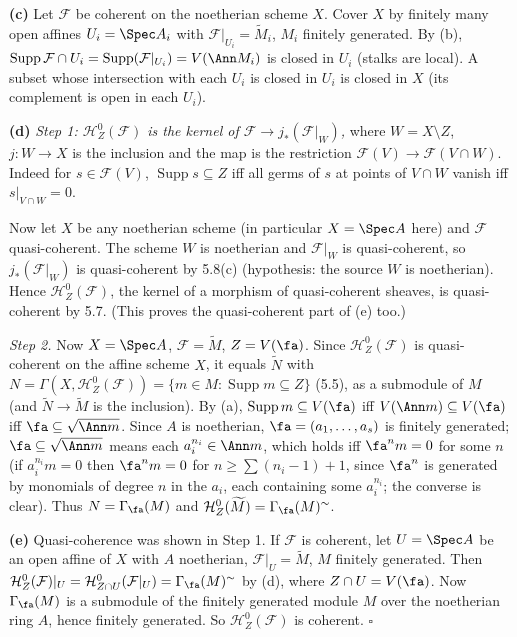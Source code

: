 \documentclass[11pt]{article}
\begin{document}
\textbf{(c)} Let $\mathcal F$ be coherent on the noetherian scheme $X$. Cover $X$ by finitely many open affines $U_i=\Spec A_i$ with $\mathcal F|_{U_i}=\widetilde M_i$, $M_i$ finitely generated. By (b), $\operatorname{Supp}\mathcal F\cap U_i=\operatorname{Supp}(\mathcal F|_{U_i})=V(\Ann M_i)$ is closed in $U_i$ (stalks are local). A subset whose intersection with each $U_i$ is closed in $U_i$ is closed in $X$ (its complement is open in each $U_i$).

\textbf{(d)} \emph{Step 1: $\mathcal H^0_Z(\mathcal F)$ is the kernel of $\mathcal F\to j_*(\mathcal F|_W)$,} where $W=X\setminus Z$, $j:W\to X$ is the inclusion and the map is the restriction $\mathcal F(V)\to\mathcal F(V\cap W)$. Indeed for $s\in\mathcal F(V)$, $\operatorname{Supp}s\subseteq Z$ iff all germs of $s$ at points of $V\cap W$ vanish iff $s|_{V\cap W}=0$.

Now let $X$ be any noetherian scheme (in particular $X=\Spec A$ here) and $\mathcal F$ quasi-coherent. The scheme $W$ is noetherian and $\mathcal F|_W$ is quasi-coherent, so $j_*(\mathcal F|_W)$ is quasi-coherent by 5.8(c) (hypothesis: the source $W$ is noetherian). Hence $\mathcal H^0_Z(\mathcal F)$, the kernel of a morphism of quasi-coherent sheaves, is quasi-coherent by 5.7. (This proves the quasi-coherent part of (e) too.)

\emph{Step 2.} Now $X=\Spec A$, $\mathcal F=\widetilde M$, $Z=V(\fa)$. Since $\mathcal H^0_Z(\mathcal F)$ is quasi-coherent on the affine scheme $X$, it equals $\widetilde N$ with $N=\Gamma(X,\mathcal H^0_Z(\mathcal F))=\{m\in M:\operatorname{Supp}m\subseteq Z\}$ (5.5), as a submodule of $M$ (and $\widetilde N\to\widetilde M$ is the inclusion). By (a), $\operatorname{Supp}m\subseteq V(\fa)$ iff $V(\Ann m)\subseteq V(\fa)$ iff $\fa\subseteq\sqrt{\Ann m}$. Since $A$ is noetherian, $\fa=(a_1,\dots,a_s)$ is finitely generated; $\fa\subseteq\sqrt{\Ann m}$ means each $a_i^{n_i}\in\Ann m$, which holds iff $\fa^nm=0$ for some $n$ (if $a_i^{n_i}m=0$ then $\fa^{n}m=0$ for $n\geq\sum(n_i-1)+1$, since $\fa^n$ is generated by monomials of degree $n$ in the $a_i$, each containing some $a_i^{n_i}$; the converse is clear). Thus $N=\Gamma_\fa(M)$ and $\mathcal H^0_Z(\widetilde M)=\Gamma_\fa(M)^{\sim}$.

\textbf{(e)} Quasi-coherence was shown in Step 1. If $\mathcal F$ is coherent, let $U=\Spec A$ be an open affine of $X$ with $A$ noetherian, $\mathcal F|_U=\widetilde M$, $M$ finitely generated. Then $\mathcal H^0_Z(\mathcal F)|_U=\mathcal H^0_{Z\cap U}(\mathcal F|_U)=\Gamma_\fa(M)^{\sim}$ by (d), where $Z\cap U=V(\fa)$. Now $\Gamma_\fa(M)$ is a submodule of the finitely generated module $M$ over the noetherian ring $A$, hence finitely generated. So $\mathcal H^0_Z(\mathcal F)$ is coherent. \hfill$\square$
\end{document}
